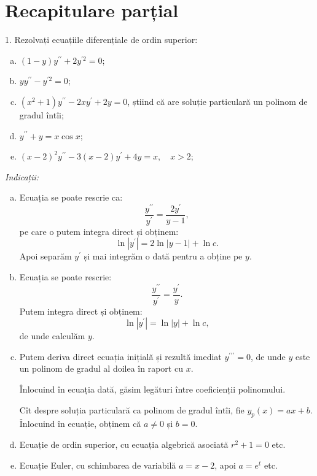 \chapter{Recapitulare parțial}

1. Rezolvați ecuațiile diferențiale de ordin superior:
\begin{enumerate}[(a)]
\item $ (1 - y)y^{\prime\prime} + 2y^{\prime 2} = 0 $;
\item $ yy^{\prime\prime} - y^{\prime 2} = 0 $;
\item $ (x^2 + 1) y^{\prime\prime} - 2xy^{\prime} + 2y = 0 $, știind că are soluție
  particulară un polinom de gradul întîi;
\item $ y^{\prime\prime} + y = x \cos x $;
\item $ (x - 2)^2 y^{\prime\prime} - 3(x - 2) y^{\prime} + 4y = x, \quad x > 2 $;
\end{enumerate}

\emph{Indicații:}
\begin{enumerate}[(a)]
\item Ecuația se poate rescrie ca:
  \[
    \dfrac{y^{\prime\prime}}{y^\prime} = \dfrac{2y^\prime}{y-1},
  \]
  pe care o putem integra direct și obținem:
  \[
    \ln |y^\prime| = 2 \ln |y-1| + \ln c.
  \]
  Apoi separăm $ y^\prime $ și mai integrăm o dată pentru a obține pe $ y $.
\item Ecuația se poate rescrie:
  \[
    \dfrac{y^{\prime\prime}}{y^\prime} = \dfrac{y^\prime}{y}.
  \]
  Putem integra direct și obținem:
  \[
    \ln |y^\prime| = \ln |y| + \ln c,
  \]
  de unde calculăm $ y $.
\item Putem deriva direct ecuația inițială și rezultă imediat $ y^{\prime\prime\prime} = 0 $,
  de unde $ y $ este un polinom de gradul al doilea în raport cu $ x $.

  Înlocuind în ecuația dată, găsim legături între coeficienții polinomului.

  Cît despre soluția particulară ca polinom de gradul întîi, fie $ y_p(x) = ax + b $.
  Înlocuind în ecuație, obținem că $ a \neq 0 $ și $ b = 0 $.
\item Ecuație de ordin superior, cu ecuația algebrică asociată $ r^2 + 1 = 0 $ etc.
\item Ecuație Euler, cu schimbarea de variabilă $ a = x - 2 $, apoi $ a = e^t $ etc.
\end{enumerate}

\vspace{1cm}

